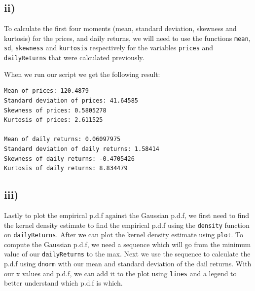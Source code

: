 \documentclass[11pt, letterpaper]{article}
\begin{document}
\subsection*{ii)}
To calculate the first four moments (mean, standard deviation, skewness and
kurtosis) for the prices,
and daily returns, we will need to use the functions \verb|mean|, \verb|sd|,
\verb|skewness| and \verb|kurtosis|
respectively for the variables \verb|prices| and \verb|dailyReturns| that were
calculated previously.

\begin{file}[q6.r ii)]
	
\end{file}

\noindent When we run our script we get the following result:

\begin{verbatim}
Mean of prices: 120.4879 
Standard deviation of prices: 41.64585 
Skewness of prices: 0.5805278 
Kurtosis of prices: 2.611525 

Mean of daily returns: 0.06097975 
Standard deviation of daily returns: 1.58414 
Skewness of daily returns: -0.4705426 
Kurtosis of daily returns: 8.834479 
\end{verbatim}

\subsection*{iii)}
Lastly to plot the empirical p.d.f against the Gaussian p.d.f, we first need to
find the kernel density
estimate to find the empirical p.d.f using the \verb|density| function on
\verb|dailyReturns|. After we can
plot the kernel density estimate using \verb|plot|. To compute the Gaussian
p.d.f, we need a sequence which
will go from the minimum value of our \verb|dailyReturns| to the max. Next we
use the sequence to calculate
the p.d.f using \verb|dnorm| with our mean and standard deviation of the dail
returns. With our
x values and p.d.f, we can add it to the plot using \verb|lines| and a legend
to better understand
which p.d.f is which.

\begin{file}[q6.r iii)]
	
\end{file}
\end{document}

